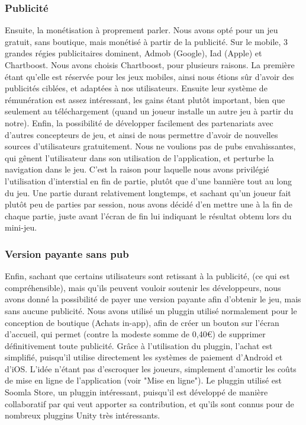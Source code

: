 \subsubsection{Publicité}

Ensuite, la monétisation à proprement parler. Nous avons opté pour un jeu gratuit, sans boutique, mais monétisé à partir de la publicité. Sur le mobile, 3 grandes régies publicitaires dominent, Admob (Google), Iad (Apple) et Chartboost. Nous avons choisis Chartboost, pour plusieurs raisons. La première étant qu'elle est réservée pour les jeux mobiles, ainsi nous étions sûr d'avoir des publicités ciblées, et adaptées à nos utilisateurs. Ensuite leur système de rémunération est assez intéressant, les gains étant plutôt important, bien que seulement au téléchargement (quand un joueur installe un autre jeu à partir du notre). Enfin, la possibilité de développer facilement des partenariats avec d'autres concepteurs de jeu, et ainsi de nous permettre d'avoir de nouvelles sources d'utilisateurs gratuitement. 
Nous ne voulions pas de pubs envahissantes, qui gênent l'utilisateur dans son utilisation de l'application, et perturbe la navigation dans le jeu. C'est la raison pour laquelle nous avons privilégié l'utilisation d'interstial en fin de partie, plutôt que d'une bannière tout au long du jeu. Une partie durant relativement longtemps, et sachant qu'un joueur fait plutôt peu de parties par session, nous avons décidé d'en mettre une à la fin de chaque partie, juste avant l'écran de fin lui indiquant le résultat obtenu lors du mini-jeu.

\subsubsection{Version payante sans pub}

Enfin, sachant que certains utilisateurs sont retissant à la publicité, (ce qui est compréhensible), mais qu'ils peuvent vouloir soutenir les développeurs, nous avons donné la possibilité de payer une version payante afin d'obtenir le jeu, mais sans aucune publicité. Nous avons utilisé un pluggin utilisé normalement pour le conception de boutique (Achats in-app), afin de créer un bouton sur l'écran d'accueil, qui permet (contre la modeste somme de 0,40\euro) de supprimer définitivement toute publicité. Grâce à l'utilisation du pluggin, l'achat est simplifié, puisqu'il utilise directement les systèmes de paiement d'Android et d'iOS.  L'idée n'étant pas d'escroquer les joueurs, simplement d'amortir les coûts de mise en ligne de l'application (voir "Mise en ligne"). Le pluggin utilisé est Soomla Store, un pluggin intéressant, puisqu'il est développé de manière collaboratif par qui veut apporter sa contribution, et qu'ils sont connus pour de nombreux pluggins Unity très intéressants. 

